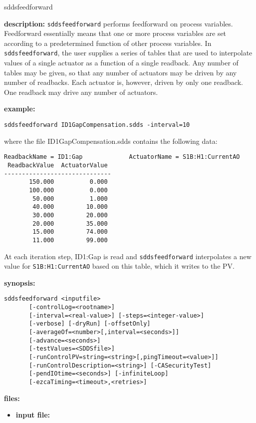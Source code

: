 \begin{sddsprog}{sddsfeedforward}
\item {\bf description:}
\verb+sddsfeedforward+ performs feedforward on process variables.
Feedforward essentially means that one or more process variables are
set according to a predetermined function of other process variables.
In \verb+sddsfeedforward+, the user supplies a series of tables that
are used to interpolate values of a single actuator as a function of a
single readback.  Any number of tables may be given, so that any
number of actuators may be driven by any number of readbacks.  Each
actuator is, however, driven by only one readback.  One readback may
drive any number of actuators.

\item {\bf example:} 
% 
\begin{verbatim}
sddsfeedforward ID1GapCompensation.sdds -interval=10
\end{verbatim}
where the file ID1GapCompensation.sdds contains the following
data:
\begin{verbatim}
ReadbackName = ID1:Gap             ActuatorName = S1B:H1:CurrentAO  
 ReadbackValue  ActuatorValue 
------------------------------
       150.000          0.000 
       100.000          0.000 
        50.000          1.000 
        40.000         10.000 
        30.000         20.000 
        20.000         35.000 
        15.000         74.000 
        11.000         99.000 
\end{verbatim}
At each iteration step, ID1:Gap is read and \verb+sddsfeedforward+ interpolates a new value for
\verb+S1B:H1:CurrentAO+ based on this table, which it writes to the PV.
\item {\bf synopsis:} 
\begin{verbatim}
sddsfeedforward <inputfile>
       [-controlLog=<rootname>]
       [-interval=<real-value>] [-steps=<integer-value>]
       [-verbose] [-dryRun] [-offsetOnly]
       [-averageOf=<number>[,interval=<seconds>]]
       [-advance=<seconds>]
       [-testValues=<SDDSfile>]
       [-runControlPV=string=<string>[,pingTimeout=<value>]]
       [-runControlDescription=<string>] [-CASecurityTest]
       [-pendIOtime=<seconds>] [-infiniteLoop]
       [-ezcaTiming=<timeout>,<retries>]
\end{verbatim}
\item {\bf files:}
\begin{itemize}
\item {\bf input file:} \par

\end{itemize}
\end{sddsprog}
